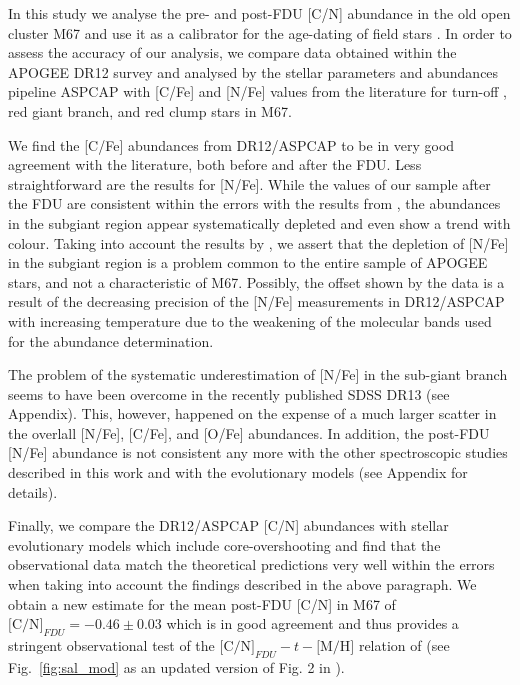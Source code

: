 \documentclass[a4paper,fleqn,usenatbib]{mnras}
\begin{document}
In this study we analyse the pre- and post-FDU [C/N] abundance in the old open cluster M67 and use it as a calibrator for the age-dating of field stars \citep[see][]{salaris2015}. In order to assess the accuracy of our analysis, we compare data obtained within the APOGEE DR12 survey and analysed by the stellar parameters and abundances pipeline ASPCAP with [C/Fe] and [N/Fe] values from the literature for turn-off \citep{shetrone2000}, red giant branch, and red clump \citep{tautv2000} stars in M67. 

We find the [C/Fe] abundances from DR12/ASPCAP to be in very good agreement with the literature, both before and after the FDU. Less straightforward are the results for [N/Fe]. While the values of our sample after the FDU are consistent within the errors with the results from \citet{tautv2000}, the abundances in the subgiant region appear systematically depleted and even show a trend with colour. Taking into account the results by \citet{masseron2015}, we assert that the depletion of [N/Fe] in the subgiant region is a problem common to the entire sample of APOGEE stars, and not a characteristic of M67. Possibly, the offset shown by the data is a result of the decreasing precision of the [N/Fe] measurements in DR12/ASPCAP with increasing temperature due to the weakening of the molecular bands used for the abundance determination. 

The problem of the systematic underestimation of [N/Fe] in the sub-giant branch seems to have been overcome in the recently published SDSS DR13 (see Appendix). This, however, happened on the expense of a much larger scatter in the overlall [N/Fe], [C/Fe], and [O/Fe] abundances. In addition, the post-FDU [N/Fe] abundance is not consistent any more with the other spectroscopic studies described in this work and with the evolutionary models (see Appendix for details).

Finally, we compare the DR12/ASPCAP [C/N] abundances with stellar evolutionary models which include core-overshooting and find that the observational data match the theoretical predictions very well within the errors when taking into account the findings described in the above paragraph. We obtain a new estimate for the mean post-FDU [C/N] in M67 of $\text{[C/N]}_{FDU}=-0.46\pm 0.03$ which is in good agreement and thus provides a stringent observational test of the $\text{[C/N]}_{FDU}-t-\text{[M/H]}$ relation of \citet{salaris2015} (see Fig.~\ref{fig:sal_mod} as an updated version of Fig. 2 in \citealt{salaris2015}).
\end{document}
